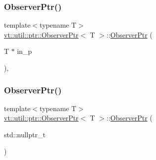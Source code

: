 \subsubsection{\texorpdfstring{Observer\+Ptr()}{ObserverPtr()}\hspace{0.1cm}{\footnotesize\ttfamily [1/5]}}
{\footnotesize\ttfamily template$<$typename T$>$ \\
\hyperlink{structvt_1_1util_1_1ptr_1_1_observer_ptr}{vt\+::util\+::ptr\+::\+Observer\+Ptr}$<$ T $>$\+::\hyperlink{structvt_1_1util_1_1ptr_1_1_observer_ptr}{Observer\+Ptr} (\begin{DoxyParamCaption}\item[{T $\ast$}]{in\+\_\+p }\end{DoxyParamCaption})\hspace{0.3cm}{\ttfamily [inline]}, {\ttfamily [explicit]}}

\mbox{\label{structvt_1_1util_1_1ptr_1_1_observer_ptr_afa392aae4efef6c10eb8372b19de5008}} 
\subsubsection{\texorpdfstring{Observer\+Ptr()}{ObserverPtr()}\hspace{0.1cm}{\footnotesize\ttfamily [2/5]}}
{\footnotesize\ttfamily template$<$typename T$>$ \\
\hyperlink{structvt_1_1util_1_1ptr_1_1_observer_ptr}{vt\+::util\+::ptr\+::\+Observer\+Ptr}$<$ T $>$\+::\hyperlink{structvt_1_1util_1_1ptr_1_1_observer_ptr}{Observer\+Ptr} (\begin{DoxyParamCaption}\item[{std\+::nullptr\+\_\+t}]{ }\end{DoxyParamCaption})\hspace{0.3cm}{\ttfamily [inline]}}

\mbox{\label{structvt_1_1util_1_1ptr_1_1_observer_ptr_a1dfb004e6df35f93847876bdafac2f3b}} 
